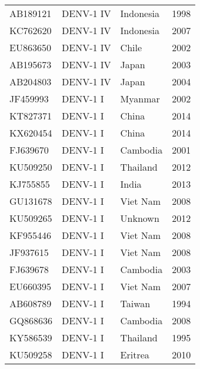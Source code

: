 \begin{scriptsize}
\begin{center}
\begin{longtable}{@{}lllc@{}}
AB189121 & DENV-1 IV           & Indonesia   & 1998            \\
KC762620 & DENV-1 IV           & Indonesia   & 2007            \\
EU863650 & DENV-1 IV           & Chile       & 2002            \\
AB195673 & DENV-1 IV           & Japan       & 2003            \\
AB204803 & DENV-1 IV           & Japan       & 2004            \\
JF459993 & DENV-1 I            & Myanmar     & 2002            \\
KT827371 & DENV-1 I            & China       & 2014            \\
KX620454 & DENV-1 I            & China       & 2014            \\
FJ639670 & DENV-1 I            & Cambodia    & 2001            \\
KU509250 & DENV-1 I            & Thailand    & 2012            \\
KJ755855 & DENV-1 I            & India       & 2013            \\
GU131678 & DENV-1 I            & Viet Nam    & 2008            \\
KU509265 & DENV-1 I            & Unknown     & 2012            \\
KF955446 & DENV-1 I            & Viet Nam    & 2008            \\
JF937615 & DENV-1 I            & Viet Nam    & 2008            \\
FJ639678 & DENV-1 I            & Cambodia    & 2003            \\
EU660395 & DENV-1 I            & Viet Nam    & 2007            \\
AB608789 & DENV-1 I            & Taiwan      & 1994            \\
GQ868636 & DENV-1 I            & Cambodia    & 2008            \\
KY586539 & DENV-1 I            & Thailand    & 1995            \\
KU509258 & DENV-1 I            & Eritrea     & 2010           
\end{longtable}

\end{center}
\end{scriptsize}